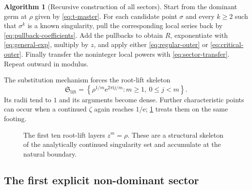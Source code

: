 \documentclass[11pt]{article}
\theoremstyle{definition}
\newtheorem{algorithm}[theorem]{Algorithm}
\theoremstyle{remark}
\newcommand{\e}{\mathrm e}
\newcommand{\ii}{\mathrm i}
\begin{document}
\begin{algorithm}[Recursive construction of all sectors]
\label{alg:all-sectors}
Start from the dominant germ at $\rho$ given by \cref{eq:t-master}.  For each
candidate point $\sigma$ and every $k\geq2$ such that $\sigma^k$ is a known
singularity, pull the corresponding local series back by
\cref{eq:pullback-coefficients}.  Add the pullbacks to obtain $R$, exponentiate
with \cref{eq:general-exp}, multiply by $z$, and apply either
\cref{eq:regular-outer} or \cref{eq:critical-outer}.  Finally transfer the
noninteger local powers with \cref{eq:sector-transfer}.  Repeat outward in
modulus.
\end{algorithm}

The substitution mechanism forces the root-lift skeleton
\begin{equation}
 \mathfrak S_{\mathrm{lift}}
 =\left\{\rho^{1/m}\e^{2\pi\ii j/m}:
          m\geq1,\ 0\leq j<m\right\}.
 \label{eq:root-lift-skeleton}
\end{equation}
Its radii tend to $1$ and its arguments become dense.  Further
characteristic points can occur when a continued $\zeta$ again reaches
$1/\e$; \cref{alg:all-sectors} treats them on the same footing.

\begin{figure}[htbp]
\centering
{}
\caption{The first ten root-lift layers
$z^m=\rho$.  These are a structural skeleton of the analytically continued
singularity set and accumulate at the natural boundary.}
\label{fig:singularity-skeleton}
\end{figure}

\subsection{The first explicit non-dominant sector}
\end{document}
